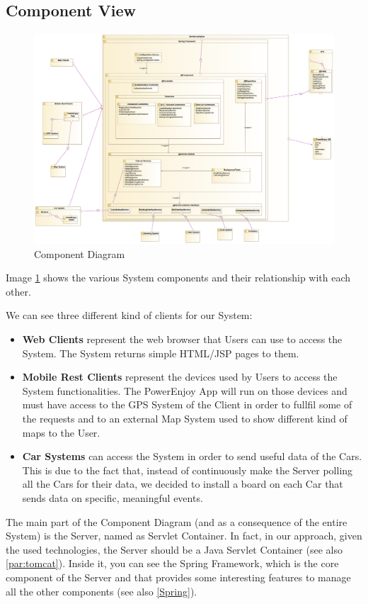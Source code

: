 \documentclass[12pt]{article}
\begin{document}
\subsection{Component View}
\begin{figure}[h]
	\centering
	\includegraphics[width=\textwidth]{../Images/Component}
	\caption{Component Diagram}
	\label{fig:component}
\end{figure}
Image \ref{fig:component} shows the various System components and their relationship with each other. 

We can see three different kind of clients for our System:
\begin{itemize}
\item\textbf{Web Clients} represent the web browser that Users can use to access the System. The System returns simple HTML/JSP pages to them.
\item\textbf{Mobile Rest Clients} represent the devices used by Users to access the System functionalities. The PowerEnjoy App will run on those devices and must have access to the GPS System of the Client in order to fullfil some of the requests and to an external Map System used to show different kind of maps to the User.
\item\textbf{Car Systems} can access the System in order to send useful data of the Cars. This is due to the fact that, instead of continuously make the Server polling all the Cars for their data, we decided to install a board on each Car that sends data on specific, meaningful events.
\end{itemize}

The main part of the Component Diagram (and as a consequence of the entire System) is the Server, named as Servlet Container. In fact, in our approach, given the used technologies, the Server should be a Java Servlet Container (see also \ref{par:tomcat}).
Inside it, you can see the Spring Framework, which is the core component of the Server and that provides some interesting features to manage all the other components (see also \ref{Spring}).
\end{document}
